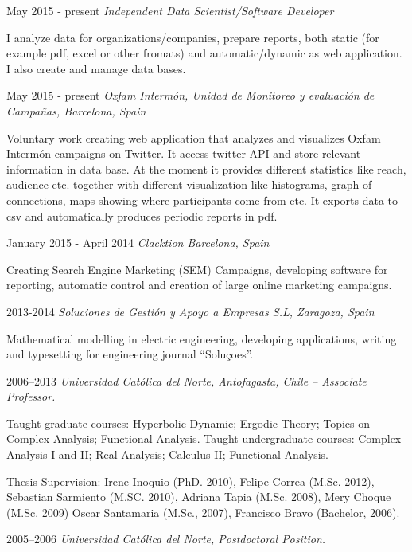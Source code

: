 \documentclass{article}
\begin{document}
\begin{CV}

\item[May 2015 - present] {\it Independent Data Scientist/Software Developer}

  I analyze data for organizations/companies, prepare reports, both
  static (for example pdf, excel or other fromats) and
  automatic/dynamic as web application. I also create and manage data
  bases.

\item[May 2015 - present] {\it Oxfam Intermón, Unidad de
    Monitoreo y evaluación de Campañas, Barcelona, Spain}

  Voluntary work creating web application that analyzes and visualizes
  Oxfam Intermón campaigns on Twitter. It access twitter API and store
  relevant information in data base. At the moment it provides
  different statistics like reach, audience etc. together with
  different visualization like histograms, graph of connections, maps
  showing where participants come from etc. It exports data to csv and
  automatically produces periodic reports in pdf.

\item[January 2015 - April 2014] {\it Clacktion
    Barcelona, Spain}

  Creating Search Engine Marketing (SEM) Campaigns, developing
  software for reporting, automatic control and creation of large
  online marketing campaigns.
  

\item[2013-2014] {\it Soluciones de Gestión y Apoyo a Empresas S.L,
    Zaragoza, Spain}

  Mathematical modelling in electric engineering, developing
  applications,  writing and typesetting for engineering journal
  ``Soluçoes''.


\item[2006--2013] {\it Universidad Cat\'olica del Norte,
    Antofagasta, Chile -- Associate Professor.}
  
  Taught graduate courses: Hyperbolic Dynamic; Ergodic Theory; Topics
  on Complex Analysis; Functional Analysis.  Taught undergraduate
  courses: Complex Analysis I and II; Real Analysis; Calculus II;
  Functional Analysis.
  
  Thesis Supervision: Irene Inoquio (PhD. 2010), Felipe Correa
  (M.Sc. 2012), Sebastian Sarmiento (M.SC. 2010), Adriana Tapia
  (M.Sc. 2008), Mery Choque (M.Sc. 2009) Oscar Santamaria (M.Sc.,
  2007), Francisco Bravo (Bachelor, 2006).
\item[2005--2006] {\it Universidad Cat\'olica del Norte, Postdoctoral Position.}


\end{CV}
\end{document}
